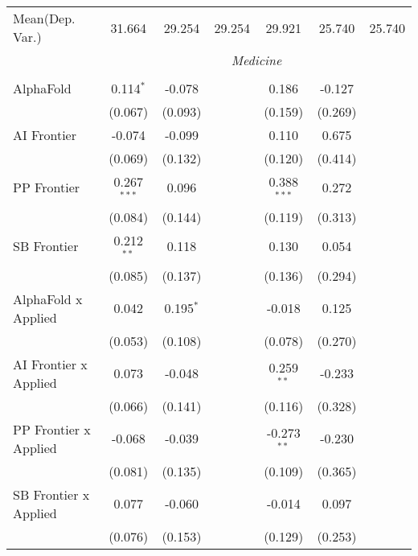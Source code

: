 \begin{tabular}{lcccccc}
Mean(Dep. Var.) & 31.664 & 29.254 & 29.254 & 29.921 & 25.740 & 25.740 \\
 & \multicolumn{6}{c}{\textit{Medicine}} \\ \\
   AlphaFold                      & 0.114$^{*}$   & -0.078      &                & 0.186         & -0.127  &   \\   
                                  & (0.067)       & (0.093)     &                & (0.159)       & (0.269) &   \\   
   AI Frontier                    & -0.074        & -0.099      &                & 0.110         & 0.675   &   \\   
                                  & (0.069)       & (0.132)     &                & (0.120)       & (0.414) &   \\   
   PP Frontier                    & 0.267$^{***}$ & 0.096       &                & 0.388$^{***}$ & 0.272   &   \\   
                                  & (0.084)       & (0.144)     &                & (0.119)       & (0.313) &   \\   
   SB Frontier                    & 0.212$^{**}$  & 0.118       &                & 0.130         & 0.054   &   \\   
                                  & (0.085)       & (0.137)     &                & (0.136)       & (0.294) &   \\   
   AlphaFold x Applied            & 0.042         & 0.195$^{*}$ &                & -0.018        & 0.125   &   \\   
                                  & (0.053)       & (0.108)     &                & (0.078)       & (0.270) &   \\   
   AI Frontier x Applied          & 0.073         & -0.048      &                & 0.259$^{**}$  & -0.233  &   \\   
                                  & (0.066)       & (0.141)     &                & (0.116)       & (0.328) &   \\   
   PP Frontier x Applied          & -0.068        & -0.039      &                & -0.273$^{**}$ & -0.230  &   \\   
                                  & (0.081)       & (0.135)     &                & (0.109)       & (0.365) &   \\   
   SB Frontier x Applied          & 0.077         & -0.060      &                & -0.014        & 0.097   &   \\   
                                  & (0.076)       & (0.153)     &                & (0.129)       & (0.253) &   \\   

\end{tabular}
